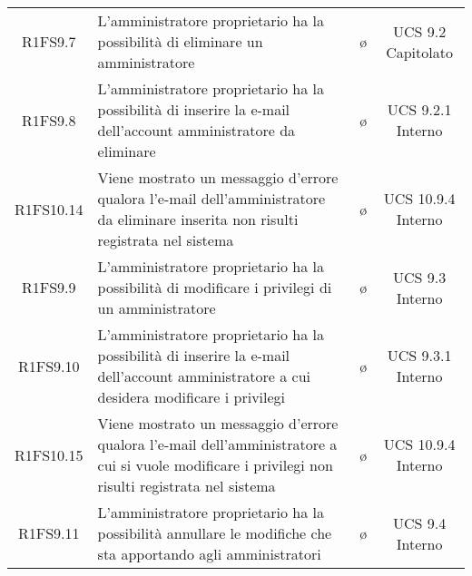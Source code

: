 {\begin{longtable}{ c C{8cm} c c}
R1FS9.7 & L'amministratore proprietario ha la possibilità di eliminare un amministratore & \o & UCS 9.2 Capitolato\\

R1FS9.8 & L'amministratore proprietario ha la possibilità di inserire la e-mail dell'account amministratore da eliminare & \o & UCS 9.2.1 Interno\\

R1FS10.14 & Viene mostrato un messaggio d'errore qualora l'e-mail dell'amministratore da eliminare inserita non risulti registrata nel sistema & \o & UCS 10.9.4 Interno\\

R1FS9.9 & L'amministratore proprietario ha la possibilità di modificare i privilegi di un amministratore & \o & UCS 9.3 Interno\\

R1FS9.10 & L'amministratore proprietario ha la possibilità di inserire la e-mail dell'account amministratore a cui desidera modificare i privilegi & \o & UCS 9.3.1 Interno\\

R1FS10.15 & Viene mostrato un messaggio d'errore qualora l'e-mail dell'amministratore a cui si vuole modificare i privilegi non risulti registrata nel sistema & \o & UCS 10.9.4 Interno\\

R1FS9.11 & L'amministratore proprietario ha la possibilità annullare le modifiche che sta apportando agli amministratori & \o & UCS 9.4 Interno\\

\end{longtable}
}